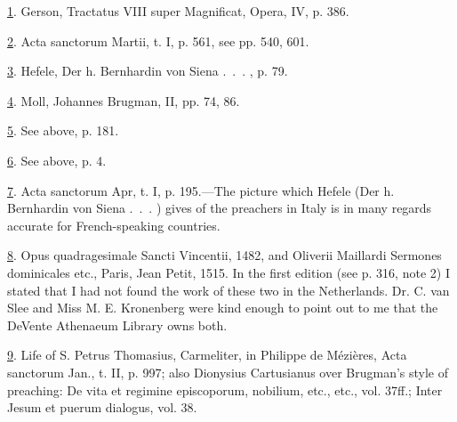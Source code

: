 \protect\hypertarget{23_NOTES.xhtmlux5cux23id_906}{\protect\hyperlink{15_Chapter_Eight__RELIGIOUS_EXCITAT.xhtmlux5cux23id_905}{1}}.
Gerson, Tractatus VIII super Magnificat, Opera, IV, p. 386.

\protect\hypertarget{23_NOTES.xhtmlux5cux23id_904}{\protect\hyperlink{15_Chapter_Eight__RELIGIOUS_EXCITAT.xhtmlux5cux23id_903}{2}}.
Acta sanctorum Martii, t. I, p. 561, see pp. 540, 601.

\protect\hypertarget{23_NOTES.xhtmlux5cux23id_902}{\protect\hyperlink{15_Chapter_Eight__RELIGIOUS_EXCITAT.xhtmlux5cux23id_901}{3}}.
Hefele, Der h. Bernhardin von Siena .~.~. , p. 79.

\protect\hypertarget{23_NOTES.xhtmlux5cux23id_900}{\protect\hyperlink{15_Chapter_Eight__RELIGIOUS_EXCITAT.xhtmlux5cux23id_899}{4}}.
Moll, Johannes Brugman, II, pp. 74, 86.

\protect\hypertarget{23_NOTES.xhtmlux5cux23id_898}{\protect\hyperlink{15_Chapter_Eight__RELIGIOUS_EXCITAT.xhtmlux5cux23id_897}{5}}.
See above, p. 181.

\protect\hypertarget{23_NOTES.xhtmlux5cux23id_896}{\protect\hyperlink{15_Chapter_Eight__RELIGIOUS_EXCITAT.xhtmlux5cux23id_895}{6}}.
See above, p. 4.

\protect\hypertarget{23_NOTES.xhtmlux5cux23id_894}{\protect\hyperlink{15_Chapter_Eight__RELIGIOUS_EXCITAT.xhtmlux5cux23id_893}{7}}.
Acta sanctorum Apr, t. I, p. 195.---The picture which Hefele (Der h.
Bernhardin von Siena .~.~. ) gives of the preachers in Italy is in many
regards accurate for French-speaking countries.

\protect\hypertarget{23_NOTES.xhtmlux5cux23id_892}{\protect\hyperlink{15_Chapter_Eight__RELIGIOUS_EXCITAT.xhtmlux5cux23id_891}{8}}.
Opus quadragesimale Sancti Vincentii, 1482, and Oliverii Maillardi
Sermones dominicales etc., Paris, Jean Petit, 1515. In the first edition
(see p. 316, note 2) I stated that I had not found the work of these two
in the Netherlands. Dr. C. van Slee and Miss M. E. Kronenberg were kind
enough to point out to me that the DeVente Athenaeum Library owns both.

\protect\hypertarget{23_NOTES.xhtmlux5cux23id_890}{\protect\hyperlink{15_Chapter_Eight__RELIGIOUS_EXCITAT.xhtmlux5cux23id_889}{9}}.
Life of S. Petrus Thomasius, Carmeliter, in Philippe de Mézières, Acta
sanctorum Jan., t. II, p. 997; also Dionysius Cartusianus over Brugman's
style of
\protect\hypertarget{23_NOTES.xhtmlux5cux23page_423}{}{}preaching: De
vita et regimine episcoporum, nobilium, etc., etc., vol. 37ff.; Inter
Jesum et puerum dialogus, vol. 38.


